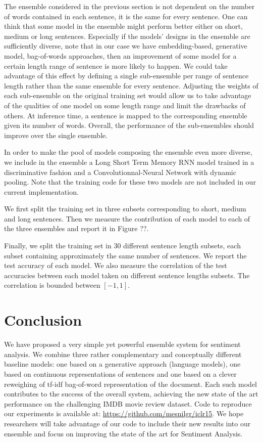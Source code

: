 \documentclass{article} %
\begin{document}
The ensemble considered in the previous section is not dependent on the number
of words contained in each sentence, it is the same for every sentence. One can
think that some model in the ensemble might perform better either on short,
medium or long sentences.  Especially if the models' designs in the ensemble
are sufficiently diverse, note that in our case we have embedding-based, generative
model, bag-of-words approaches, then an improvement of some model for a certain
length range of sentence is more likely to happen. We could take advantage of
this effect by defining a single sub-ensemble per range of sentence length
rather than the same ensemble for every sentence. Adjusting the weights of each
sub-ensemble on the original training set would allow us to take advantage of the
qualities of one model on some length range and limit the drawbacks of others.
At inference time, a sentence is mapped to the corresponding ensemble given its
number of words.  Overall, the performance of the sub-ensembles should improve
over the single ensemble. 

In order to make the pool of models composing the ensemble even more diverse, we
include in the ensemble a Long Short Term Memory RNN model trained in a
discriminative fashion and a Convolutionnal-Neural Network with dynamic
pooling. Note that the training code for these two models are not included in
our current implementation.

We first split the training set in three subsets corresponding to short, medium
and long sentences. Then we measure the contribution of each model to each of
the three ensembles and report it in Figure ??.

Finally, we split the training set in 30 different sentence length subsets, each subset
containing approximately the same number of sentences. We report the test
accuracy of each model. We also measure the correlation of the test accuracies between each model
taken on different sentence lengths subsets. The correlation is bounded between $[ -1, 1]$. 
\fi


\section{Conclusion}

We have proposed a very simple yet powerful ensemble system for sentiment
analysis. We combine three rather complementary and conceptually different
baseline models: one based on a generative approach (language models), one
based on continuous representations of sentences and one based on a clever
reweighing of tf-idf bag-of-word representation of the document. Each such
model contributes to the success of the overall system, achieving the new state
of the art performance on the challenging IMDB movie review dataset. Code to
reproduce our experiments is available at: \url{https://github.com/mesnilgr/iclr15}.
We hope researchers will take advantage of our code to include their new
results into our ensemble and focus on improving the state of the art for
Sentiment Analysis.
\end{document}
